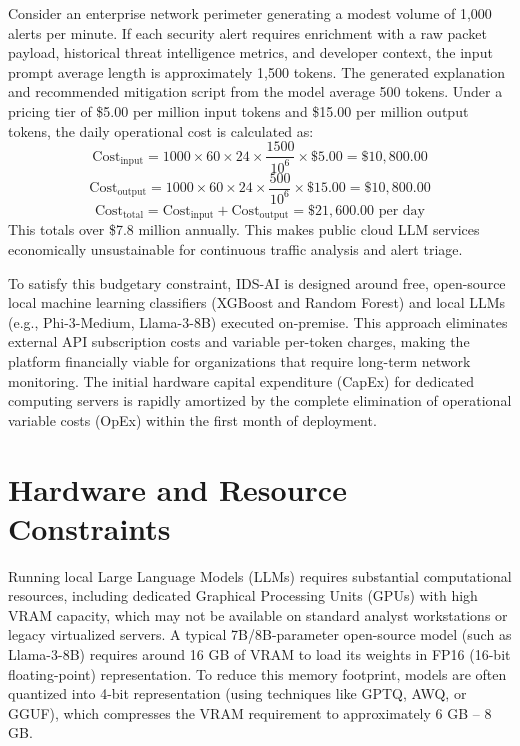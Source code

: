 \documentclass[12pt,a4paper]{report}
\begin{document}
Consider an enterprise network perimeter generating a modest volume of 1,000 alerts per minute. If each security alert requires enrichment with a raw packet payload, historical threat intelligence metrics, and developer context, the input prompt average length is approximately 1,500 tokens. The generated explanation and recommended mitigation script from the model average 500 tokens. Under a pricing tier of \$5.00 per million input tokens and \$15.00 per million output tokens, the daily operational cost is calculated as:
\begin{equation}
  \text{Cost}_{\text{input}} = 1000 \times 60 \times 24 \times \frac{1500}{10^6} \times \$5.00 = \$10,800.00
\end{equation}
\begin{equation}
  \text{Cost}_{\text{output}} = 1000 \times 60 \times 24 \times \frac{500}{10^6} \times \$15.00 = \$10,800.00
\end{equation}
\begin{equation}
  \text{Cost}_{\text{total}} = \text{Cost}_{\text{input}} + \text{Cost}_{\text{output}} = \$21,600.00 \text{ per day}
\end{equation}
This totals over \$7.8 million annually. This makes public cloud LLM services economically unsustainable for continuous traffic analysis and alert triage.

To satisfy this budgetary constraint, IDS-AI is designed around free, open-source local machine learning classifiers (XGBoost and Random Forest) and local LLMs (e.g., Phi-3-Medium, Llama-3-8B) executed on-premise. This approach eliminates external API subscription costs and variable per-token charges, making the platform financially viable for organizations that require long-term network monitoring. The initial hardware capital expenditure (CapEx) for dedicated computing servers is rapidly amortized by the complete elimination of operational variable costs (OpEx) within the first month of deployment.

\section{Hardware and Resource Constraints}

Running local Large Language Models (LLMs) requires substantial computational resources, including dedicated Graphical Processing Units (GPUs) with high VRAM capacity, which may not be available on standard analyst workstations or legacy virtualized servers. A typical 7B/8B-parameter open-source model (such as Llama-3-8B) requires around 16 GB of VRAM to load its weights in FP16 (16-bit floating-point) representation. To reduce this memory footprint, models are often quantized into 4-bit representation (using techniques like GPTQ, AWQ, or GGUF), which compresses the VRAM requirement to approximately 6 GB -- 8 GB.
\end{document}
